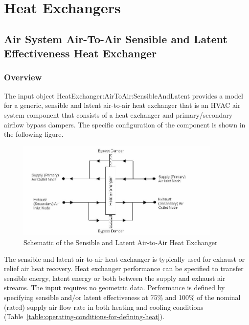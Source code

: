 \section{Heat Exchangers }\label{heat-exchangers}

\subsection{Air System Air-To-Air Sensible and Latent Effectiveness Heat Exchanger}\label{air-system-air-to-air-sensible-and-latent-effectiveness-heat-exchanger}

\subsubsection{Overview}\label{overview-019}

The input object HeatExchanger:AirToAir:SensibleAndLatent provides a model for a generic, sensible and latent air-to-air heat exchanger that is an HVAC air system component that consists of a heat exchanger and primary/secondary airflow bypass dampers. The specific configuration of the component is shown in the following figure.

\begin{figure}[hbtp] %
\centering
\includegraphics[width=0.9\textwidth, height=0.9\textheight, keepaspectratio=true]{media/image5455.png}
\caption{Schematic of the Sensible and Latent Air-to-Air Heat Exchanger \protect \label{fig:schematic-of-the-sensible-and-latent-air-to}}
\end{figure}

The sensible and latent air-to-air heat exchanger is typically used for exhaust or relief air heat recovery. Heat exchanger performance can be specified to transfer sensible energy, latent energy or both between the supply and exhaust air streams. The input requires no geometric data. Performance is defined by specifying sensible and/or latent effectiveness at 75\% and 100\% of the nominal (rated) supply air flow rate in both heating and cooling conditions (Table~\ref{table:operating-conditions-for-defining-heat}).

